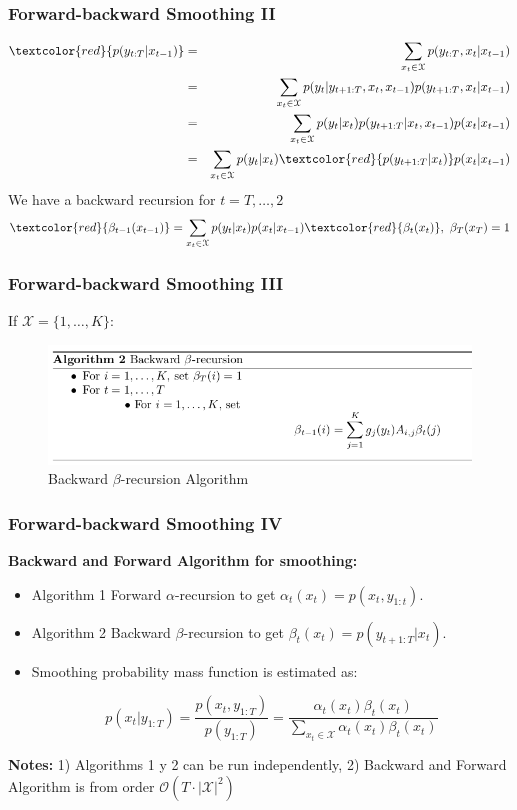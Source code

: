 \documentclass[xcolor=dvipsnames, compress]{beamer}
\begin{document}
\begin{frame}
\frametitle{Forward-backward Smoothing II}
\hspace{-0.2cm}
\begin{eqnarray*}
\textcolor{red}{p(y_{t	:T} |x_{t-1} )} & = & \sum_{x_t \in \mathcal{X}} p(y_{t:T},x_t |x_{t-1} )\\
                       & = & \sum_{x_t \in \mathcal{X}} p(y_{t}|y_{t+1:T},x_t,x_{t-1}) p(y_{t+1:T},x_t |x_{t-1} ) \\
     & = & \sum_{x_t \in \mathcal{X}} p(y_{t}|x_{t}) p(y_{t+1:T}|x_t,x_{t-1}) p(x_{t}|x_{t-1}) \\
     & = & \sum_{x_t \in \mathcal{X}} p(y_{t}|x_t) \textcolor{red}{p(y_{t+1:T}|x_t)} p(x_{t}|x_{t-1}) 
\end{eqnarray*}
We have a backward recursion for $t=T, \ldots, 2$
$$ \textcolor{red}{\beta_{t-1}(x_{t-1})} = \sum_{x_t \in \mathcal{X}} p(y_{t}|x_t)  p(x_{t}|x_{t-1}) \textcolor{red}{\beta_t(x_t)}, \mbox{ } \beta_T(x_T)=1 $$

\end{frame}

\begin{frame}
\frametitle{Forward-backward Smoothing III}

If $\mathcal{X}=\{1,\ldots, K\}$:
\begin{figure}
	\includegraphics[scale=0.45]{images/backward_beta_recursion.jpg}
	\caption{Backward $\beta$-recursion Algorithm}
\end{figure}
\end{frame}

\begin{frame}
\frametitle{Forward-backward Smoothing IV}
\textbf{Backward and Forward Algorithm for smoothing:}

\begin{itemize}
	\item Algorithm 1 Forward $\alpha$-recursion to get $\alpha_t(x_t)=p(x_t , y_{1:t})$.
	\item Algorithm 2 Backward $\beta$-recursion to get $\beta_t(x_t)=p(y_{t+1:T} |x_t )$.
	\item Smoothing probability mass function is estimated as:
	
	$$ p(x_t | y_{1:T}) = \frac{p(x_t, y_{1:T})}{p(y_{1:T})}=\frac{\alpha_t(x_t) \beta_t(x_t)}{\sum_{x_t \in \mathcal{X}} \alpha_t(x_t) \beta_t(x_t)}$$

\end{itemize}
\vspace{0.5cm}
 \textbf{Notes:} 1) Algorithms 1 y 2 can be run independently, 2) Backward and Forward Algorithm is from order $\mathcal{O}(T\cdot|\mathcal{X}|^2)$

\end{frame}
\end{document}
